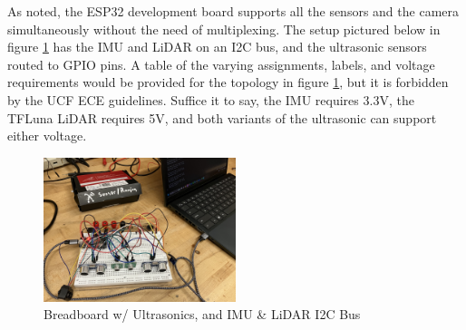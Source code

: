 \noindent As noted, the ESP32 development board supports all the sensors and the camera simultaneously without the need of multiplexing. The setup pictured below in figure \ref{fig:bb-test} has the IMU and LiDAR on an I2C bus, and the ultrasonic sensors routed to GPIO pins. A table of the varying assignments, labels, and voltage requirements would be provided for the topology in figure \ref{fig:bb-test}, but it is forbidden by the UCF ECE guidelines. Suffice it to say, the IMU requires 3.3V, the TFLuna LiDAR requires 5V, and both variants of the ultrasonic can support either voltage.\\
\begin{figure}[H]
	\centering
	\includegraphics[width=0.5\textwidth]{./Images/breadboard-test.jpg}
	\caption{\label{fig:bb-test}Breadboard w/ Ultrasonics, and IMU \& LiDAR I2C Bus}
\end{figure}

